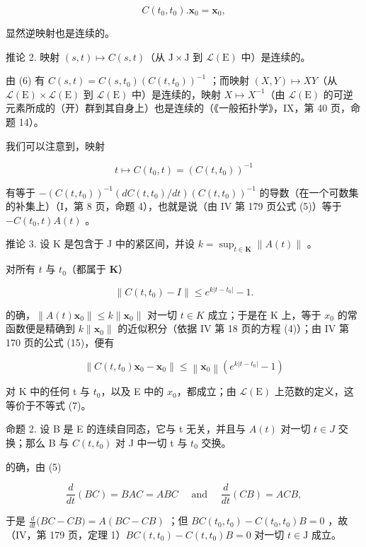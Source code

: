 \[
C (t _ {0}, t _ {0}). \mathbf {x} _ {0} = \mathbf {x} _ {0},
\]

显然逆映射也是连续的。

推论 2. 映射 \((s,t)\mapsto C(s,t)\)（从 \(\mathrm{J}\times \mathrm{J}\) 到 \(\mathcal{L}(\mathrm{E})\) 中）是连续的。

由 (6) 有 \(C(s, t) = C(s, t_0) \left( C(t, t_0) \right)^{-1}\) ；而映射 \((X, Y) \mapsto XY\)（从 \(\mathcal{L}(\mathrm{E}) \times \mathcal{L}(\mathrm{E})\) 到 \(\mathcal{L}(\mathrm{E})\) 中）是连续的，映射 \(X \mapsto X^{-1}\)（由 \(\mathcal{L}(\mathrm{E})\) 的可逆元素所成的（开）群到其自身上）也是连续的（《一般拓扑学》，IX，第 40 页，命题 14）。

我们可以注意到，映射

\[
t \mapsto C (t _ {0}, t) = (C (t, t _ {0})) ^ {- 1}
\]

有等于 \(-(C(t,t_{0}))^{-1}(dC(t,t_{0})/dt)(C(t,t_{0}))^{-1}\) 的导数（在一个可数集的补集上）（I，第 8 页，命题 4），也就是说（由 IV 第 179 页公式 (5)）等于 \(-C(t_{0},t)A(t)\) 。

推论 3. 设 K 是包含于 J 中的紧区间，并设 \(k = \sup_{t \in \mathbf{K}} \| A(t) \|\) 。

对所有 \(t\) 与 \(t_0\)（都属于 \(\mathbf{K}\)）

\[
\left\| C \left(t, t _ {0}\right) - I \right\| \leqslant e ^ {k \left| t - t _ {0} \right|} - 1.\tag{7}
\]

的确，\(\|A(t)\mathbf{x}_{0}\|\leqslant k\|\mathbf{x}_{0}\|\) 对一切 \(t\in K\) 成立；于是在 K 上，等于 \(x_{0}\) 的常函数便是精确到 \(k\|\mathbf{x}_{0}\|\) 的近似积分（依据 IV 第 18 页的方程 (4)）；由 IV 第 170 页的公式 (15)，便有

\[
\left\| C \left(t, t _ {0}\right) \mathbf {x} _ {0} - \mathbf {x} _ {0} \right\| \leqslant \left\| \mathbf {x} _ {0} \right\| \left(e ^ {k | t - t _ {0} |} - 1\right)
\]

对 K 中的任何 t 与 \(t_{0}\)，以及 E 中的 \(x_{0}\)，都成立；由 \(\mathcal{L}(\mathrm{E})\) 上范数的定义，这等价于不等式 (7)。

命题 2. 设 B 是 E 的连续自同态，它与 t 无关，并且与 \(A(t)\) 对一切 \(t \in J\) 交换；那么 B 与 \(C(t, t_{0})\) 对 J 中一切 t 与 \(t_{0}\) 交换。

的确，由 (5)

\[
\frac {d}{d t} (B C) = B A C = A B C \quad \text { and } \quad \frac {d}{d t} (C B) = A C B,
\]

于是 \(\frac{d}{dt}\bigl (BC - CB\bigr) = A(BC - CB)\) ；但 \(BC(t_0,t_0) - C(t_0,t_0)B = 0\) ，故（IV，第 179 页，定理 1）\(BC(t,t_0) - C(t,t_0)B = 0\) 对一切 \(t\in \mathrm{J}\) 成立。

